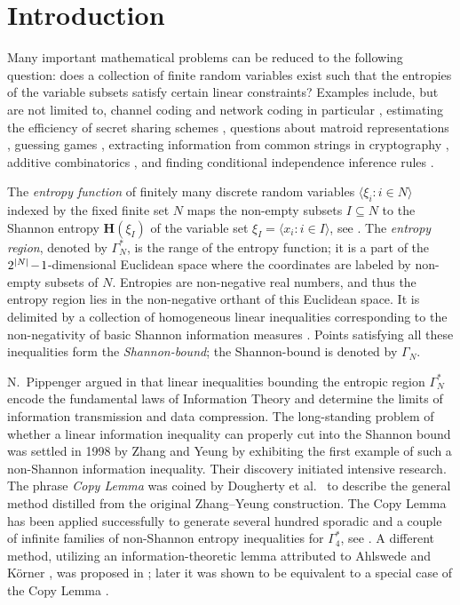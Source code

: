 \documentclass[reqno]{amsart}
\theoremstyle{definition}
\newcommand\tsp{\mkern 1.5mu}
\def\Hen{\mathbf H}
\def\m#1{\tsp{#1}\tsp}
\def\G#1{\Gamma_{\!#1}}
\def\Ga#1{\Gamma^*_{\!#1}}
\begin{document}
\maketitle

\section{Introduction}

Many important mathematical problems can be reduced to the following
question: does a collection of finite random variables exist such that
the entropies of the variable subsets satisfy certain linear constraints?
Examples include, but are not limited to, channel coding \cite{Csiszar.Korner}
and network coding in particular \cite{yeung-network}, estimating the
efficiency of secret sharing schemes \cite{Beimel,Beimel.Orlov,G.Rom},
questions about matroid representations \cite{BBFP}, guessing games
\cite{riis,rombach}, extracting information from common strings in cryptography
\cite{groth}, additive combinatorics \cite{madiman-etal}, and finding
conditional independence inference rules \cite{studeny}.

The \emph{entropy function} of finitely many discrete random variables
$\langle \xi_i:i\in N\rangle$ indexed by the fixed finite set $N$ maps the
non-empty subsets $I\subseteq N$ to the Shannon entropy $\Hen(\xi_I)$ of the
variable set $\xi_I=\langle x_i:i\in I\rangle$, see \cite{yeung-book}. The
\emph{entropy region}, denoted by $\Ga N$, is the range of the entropy
function; it is a part of the $2^{|N|}\m-1$-dimensional Euclidean space where
the coordinates are labeled by non-empty subsets of $N$. Entropies are
non-negative real numbers, and thus the entropy region lies in the
non-negative orthant of this Euclidean space. It is delimited by a
collection of homogeneous linear
inequalities corresponding to the non-negativity of basic Shannon
information measures \cite{yeung-book}. Points satisfying all these
inequalities form the \emph{Shannon-bound}; the Shannon-bound is denoted by $\G N$.

N.~Pippenger argued in \cite{pippenger} that linear inequalities bounding
the entropic region $\Ga N$ encode the fundamental laws of Information
Theory and determine the limits of information transmission and data
compression. The long-standing problem of whether a linear information
inequality can properly cut into the Shannon bound was settled in 1998 by
Zhang and Yeung \cite{ZhY.ineq} by exhibiting the first example of such a
non-Shannon information inequality. Their discovery initiated intensive
research. The phrase \emph{Copy Lemma} was coined by Dougherty et
al.~\cite{DFZ11} to describe the general method distilled from the original
Zhang--Yeung construction. The Copy Lemma has been applied successfully to
generate several hundred sporadic and a couple of infinite families of
non-Shannon entropy inequalities for $\Ga4$, see
\cite{csirmaz.book,DFZ11,M.infinf}. A different method, utilizing an
information-theoretic lemma attributed to Ahlswede and K\"orner \cite{AK},
was proposed in \cite{MMRV}; later it was shown to be equivalent to a
special case of the Copy Lemma \cite{Kaced}.
\end{document}
